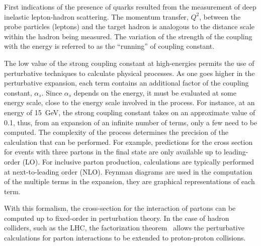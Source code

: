 First indications of the presence of quarks resulted from the measurement of deep inelastic lepton-hadron scattering. The momentum transfer, $Q^2$, between the probe particles (leptons) and the target hadron is analogous to the distance scale within the hadron being measured. The variation of the strength of the coupling with the energy is referred to as the ``running'' of coupling constant.


The low value of the strong coupling constant at high-energies permits the use of perturbative techniques to calculate physical processes. As one goes higher in the perturbative expansion, each term contains an additional factor of the coupling constant, $\alpha_s$.  Since  $\alpha_s$ depends on the energy, it must be evaluated at some energy scale, close to the energy scale involved in the process.  For instance, at an energy of 15~GeV, the strong coupling constant takes on an approximate value of 0.1, thus, from an expansion of an infinite number of terms, only a few need to be computed.  The complexity of the process determines the precision of the calculation that can be performed.  For example, predictions for the cross section for events with three partons in the final state are only available up to leading-order (LO).  For inclusive parton production, calculations are typically performed at next-to-leading order (NLO).  Feynman diagrams are used in the computation of the multiple terms in the expansion, they are graphical representations of each term. %



With this formalism, the cross-section for the interaction of partons can be computed up to fixed-order in perturbation theory. In the case of hadron colliders, such as the LHC, the factorization theorem~\cite{Collins:1989gx} allows the perturbative calculations for parton interactions to be extended to proton-proton collisions.



